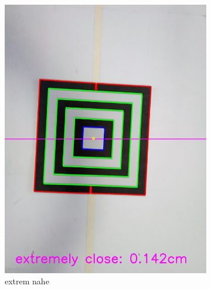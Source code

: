 \begin{figure}
\begin{subfigure}{0.3\textwidth}
        \includegraphics[width=0.95\linewidth]{pics/zielfeld/08.jpg}
        \caption{extrem nahe}
        \label{fig:zielfeld8}
    \end{subfigure}
    \begin{subfigure}{0.3\textwidth}
        \centering

\end{subfigure}
\end{figure}
